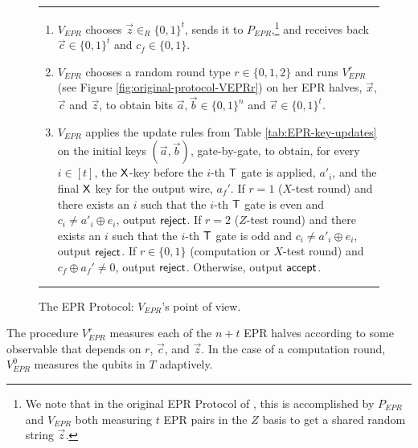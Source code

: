\documentclass[11pt]{article}
\theoremstyle{remark}
\theoremstyle{definition}
\begin{document}
\begin{figure}[H]
\rule[1ex]{16.5cm}{0.5pt}
\begin{enumerate}
\item $V_{EPR}$ chooses $\vec{z}\in_R\{0,1\}^t$, sends it to $P_{EPR}$,\footnote{We note that in the original EPR Protocol of \cite{broadbent15howtoverify}, this is accomplished by $P_{EPR}$ and $V_{EPR}$ both measuring $t$ EPR pairs in the $Z$ basis to get a shared random string $\vec{z}$.} and receives back $\vec{c}\in\{0,1\}^t$ and $c_f\in\{0,1\}$.
\item $V_{EPR}$ chooses a random round type $r\in\{0,1,2\}$ and runs $V_{EPR}^r$ (see Figure \ref{fig:original-protocol-VEPRr}) on her EPR halves, $\vec{x}$, $\vec{c}$ and $\vec{z}$, to obtain bits $\vec{a},\vec{b}\in\{0,1\}^n$ and $\vec{e}\in\{0,1\}^t$. 
\item $V_{EPR}$ applies the update rules from Table \ref{tab:EPR-key-updates} on the initial keys $(\vec{a},\vec{b})$, gate-by-gate, to obtain, for every $i\in [t]$, the $\sf X$-key before the $i$-th $\sf T$ gate is applied, $a'_i$, and the final $\sf X$ key for the output wire, $a_f'$. If $r=1$ ($X$-test round) and there exists an $i$ such that the $i$-th $\sf T$ gate is even and $c_i\neq a'_i\oplus e_i$, output $\sf reject$. If $r=2$ ($Z$-test round) and there exists an $i$ such that the $i$-th $\sf T$ gate is odd and $c_i\neq a'_i\oplus e_i$, output $\sf reject$. If $r\in\{0,1\}$ (computation or $X$-test round) and $c_f\oplus a_f'\neq 0$, output $\sf reject$. Otherwise, output $\sf accept$. 
\end{enumerate}
\rule[2ex]{16.5cm}{0.5pt}\vspace{-.5cm}
\caption{The EPR Protocol: $V_{EPR}$'s point of view.}
  \label{fig:original-protocol-VEPR}
\end{figure}

The procedure $V_{EPR}^r$ measures each of the $n+t$ EPR halves according to some observable that depends on $r$, $\vec{c}$, and $\vec{z}$. In the case of a computation round, $V_{EPR}^0$ measures the qubits in $T$ adaptively. 
\end{document}
